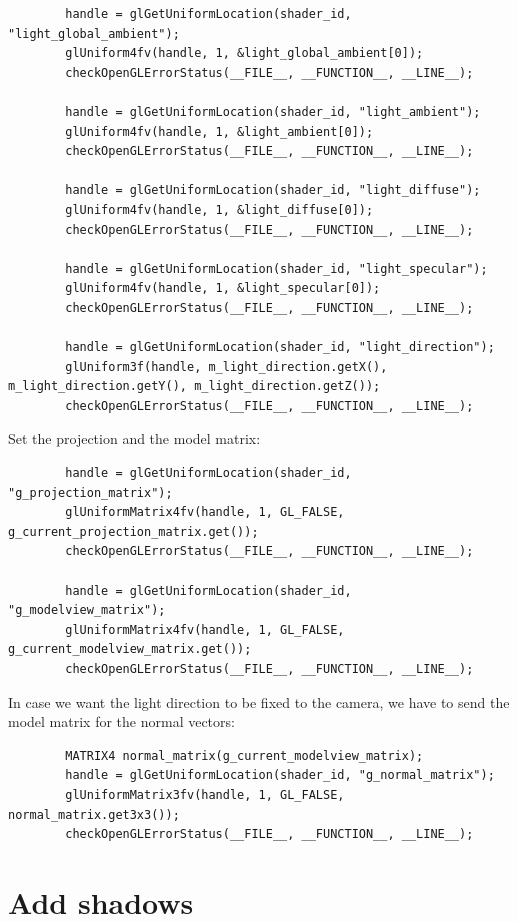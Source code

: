 \documentclass[12pt]{report}
\begin{document}
\begin{lstlisting}
        handle = glGetUniformLocation(shader_id, "light_global_ambient");
        glUniform4fv(handle, 1, &light_global_ambient[0]);
        checkOpenGLErrorStatus(__FILE__, __FUNCTION__, __LINE__);

        handle = glGetUniformLocation(shader_id, "light_ambient");
        glUniform4fv(handle, 1, &light_ambient[0]);
        checkOpenGLErrorStatus(__FILE__, __FUNCTION__, __LINE__);

        handle = glGetUniformLocation(shader_id, "light_diffuse");
        glUniform4fv(handle, 1, &light_diffuse[0]);
        checkOpenGLErrorStatus(__FILE__, __FUNCTION__, __LINE__);

        handle = glGetUniformLocation(shader_id, "light_specular");
        glUniform4fv(handle, 1, &light_specular[0]);
        checkOpenGLErrorStatus(__FILE__, __FUNCTION__, __LINE__);

        handle = glGetUniformLocation(shader_id, "light_direction");
        glUniform3f(handle, m_light_direction.getX(), m_light_direction.getY(), m_light_direction.getZ());
        checkOpenGLErrorStatus(__FILE__, __FUNCTION__, __LINE__);
\end{lstlisting}

Set the projection and the model matrix: 
\begin{lstlisting}
    	handle = glGetUniformLocation(shader_id, "g_projection_matrix");
        glUniformMatrix4fv(handle, 1, GL_FALSE, g_current_projection_matrix.get());
        checkOpenGLErrorStatus(__FILE__, __FUNCTION__, __LINE__);

        handle = glGetUniformLocation(shader_id, "g_modelview_matrix");
        glUniformMatrix4fv(handle, 1, GL_FALSE, g_current_modelview_matrix.get());
        checkOpenGLErrorStatus(__FILE__, __FUNCTION__, __LINE__);
\end{lstlisting}

In case we want the light direction to be fixed to the camera, we have to send the model matrix for the normal vectors:
\begin{lstlisting}
        MATRIX4 normal_matrix(g_current_modelview_matrix);
        handle = glGetUniformLocation(shader_id, "g_normal_matrix");
        glUniformMatrix3fv(handle, 1, GL_FALSE, normal_matrix.get3x3());
        checkOpenGLErrorStatus(__FILE__, __FUNCTION__, __LINE__);
\end{lstlisting}


\chapter{Add shadows}
\end{document}

